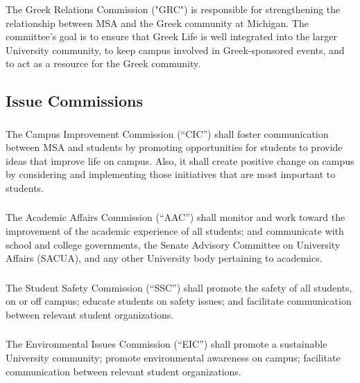 \subsubsection{}
The Greek Relations Commission ("GRC") is responsible for strengthening the relationship between MSA and the Greek community at Michigan. The committee's goal is to ensure that Greek Life is well integrated into the larger University community, to keep campus involved in Greek-sponsored events, and to act as a resource for the Greek community.

\subsection{Issue Commissions}

\subsubsection{}
The Campus Improvement Commission (``CIC'') shall foster communication between MSA and students by promoting opportunities for students to provide ideas that improve life on campus. Also, it shall create positive change on campus by considering and implementing those initiatives that are most important to students.

\subsubsection{}
The Academic Affairs Commission (``AAC'') shall 
\subsubsubsection{}
monitor and work toward the improvement of the academic experience of all students; and
\subsubsubsection{}
communicate with school and college governments, the Senate Advisory Committee on University Affairs (SACUA), and any other University body pertaining to academics.

\subsubsection{}
The Student Safety Commission (``SSC'') shall promote the safety of all students, on or off campus; educate students on safety issues; and facilitate communication between relevant student organizations.

\subsubsection{}
The Environmental Issues Commission (``EIC'') shall
\subsubsubsection{}
promote a sustainable University community;
\subsubsubsection{}
promote environmental awareness on campus;
\subsubsubsection{}
facilitate communication between relevant student organizations.

